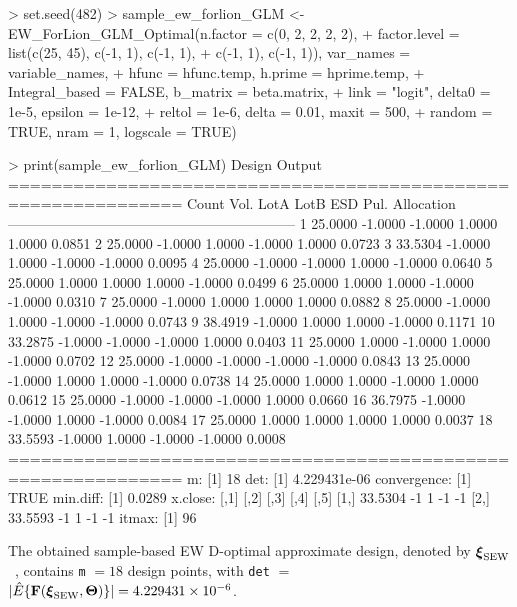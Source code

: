 \begin{example}
> set.seed(482)
> sample_ew_forlion_GLM <- EW_ForLion_GLM_Optimal(n.factor = c(0, 2, 2, 2, 2), 
+                          factor.level = list(c(25, 45), c(-1, 1), c(-1, 1),
+                          c(-1, 1), c(-1, 1)), var_names = variable_names, 
+                          hfunc = hfunc.temp, h.prime = hprime.temp, 
+                          Integral_based = FALSE, b_matrix = beta.matrix, 
+                          link = "logit", delta0 = 1e-5, epsilon = 1e-12, 
+                          reltol = 1e-6, delta = 0.01, maxit = 500, 
+                          random = TRUE, nram = 1, logscale = TRUE)
\end{example}
\begin{example}
> print(sample_ew_forlion_GLM)
Design Output
============================================================== 
Count  Vol.     LotA     LotB     ESD      Pul.     Allocation
-------------------------------------------------------------- 
1      25.0000  -1.0000  -1.0000   1.0000   1.0000  0.0851
2      25.0000  -1.0000   1.0000  -1.0000   1.0000  0.0723
3      33.5304  -1.0000   1.0000  -1.0000  -1.0000  0.0095
4      25.0000  -1.0000  -1.0000   1.0000  -1.0000  0.0640
5      25.0000   1.0000   1.0000   1.0000  -1.0000  0.0499
6      25.0000   1.0000   1.0000  -1.0000  -1.0000  0.0310
7      25.0000  -1.0000   1.0000   1.0000   1.0000  0.0882
8      25.0000  -1.0000   1.0000  -1.0000  -1.0000  0.0743
9      38.4919  -1.0000   1.0000   1.0000  -1.0000  0.1171
10     33.2875  -1.0000  -1.0000  -1.0000   1.0000  0.0403
11     25.0000   1.0000  -1.0000   1.0000  -1.0000  0.0702
12     25.0000  -1.0000  -1.0000  -1.0000  -1.0000  0.0843
13     25.0000  -1.0000   1.0000   1.0000  -1.0000  0.0738
14     25.0000   1.0000   1.0000  -1.0000   1.0000  0.0612
15     25.0000  -1.0000  -1.0000  -1.0000   1.0000  0.0660
16     36.7975  -1.0000  -1.0000   1.0000  -1.0000  0.0084
17     25.0000   1.0000   1.0000   1.0000   1.0000  0.0037
18     33.5593  -1.0000   1.0000  -1.0000  -1.0000  0.0008
============================================================== 
m:
[1] 18
det:
[1] 4.229431e-06
convergence:
[1] TRUE
min.diff:
[1] 0.0289
x.close:
        [,1] [,2] [,3] [,4] [,5]
[1,] 33.5304   -1    1   -1   -1
[2,] 33.5593   -1    1   -1   -1
itmax:
[1] 96
\end{example}

The obtained sample-based EW D-optimal approximate design, denoted by $\boldsymbol{\xi}_{\rm SEW}$~, contains {\tt m} $=18$ design points, with {\tt det} $=$ $| \hat{E}\{{\mathbf F}({\boldsymbol \xi}_{\rm SEW}, \boldsymbol{\Theta})\}| = 4.229431 \times 10^{-6}$.

